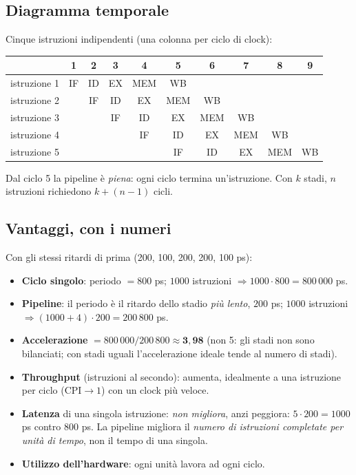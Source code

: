 \subsection{Diagramma temporale}
Cinque istruzioni indipendenti (una colonna per ciclo di clock):
\begin{center}
\small
\begin{tabular}{@{}l|ccccccccc@{}}
 & 1 & 2 & 3 & 4 & 5 & 6 & 7 & 8 & 9 \\
\hline
istruzione 1 & IF & ID & EX & MEM & WB & & & & \\
istruzione 2 & & IF & ID & EX & MEM & WB & & & \\
istruzione 3 & & & IF & ID & EX & MEM & WB & & \\
istruzione 4 & & & & IF & ID & EX & MEM & WB & \\
istruzione 5 & & & & & IF & ID & EX & MEM & WB \\
\end{tabular}
\end{center}
Dal ciclo 5 la pipeline è \emph{piena}: ogni ciclo termina un'istruzione. Con $k$ stadi, $n$ istruzioni richiedono $k + (n-1)$ cicli.

\subsection{Vantaggi, con i numeri}
Con gli stessi ritardi di prima (200, 100, 200, 200, 100 ps):
\begin{itemize}
    \item \textbf{Ciclo singolo}: periodo $= 800$ ps; $1000$ istruzioni $\Rightarrow 1000\cdot 800 = 800\,000$ ps.
    \item \textbf{Pipeline}: il periodo è il ritardo dello stadio \emph{più lento}, $200$ ps; $1000$ istruzioni $\Rightarrow (1000+4)\cdot 200 = 200\,800$ ps.
    \item \textbf{Accelerazione} $= 800\,000/200\,800 \approx \mathbf{3{,}98}$ (non 5: gli stadi non sono bilanciati; con stadi uguali l'accelerazione ideale tende al numero di stadi).
    \item \textbf{Throughput} (istruzioni al secondo): aumenta, idealmente a una istruzione per ciclo ($\text{CPI}\to 1$) con un clock più veloce.
    \item \textbf{Latenza} di una singola istruzione: \emph{non migliora}, anzi peggiora: $5\cdot 200 = 1000$ ps contro $800$ ps. La pipeline migliora il \emph{numero di istruzioni completate per unità di tempo}, non il tempo di una singola.
    \item \textbf{Utilizzo dell'hardware}: ogni unità lavora ad ogni ciclo.
\end{itemize}


